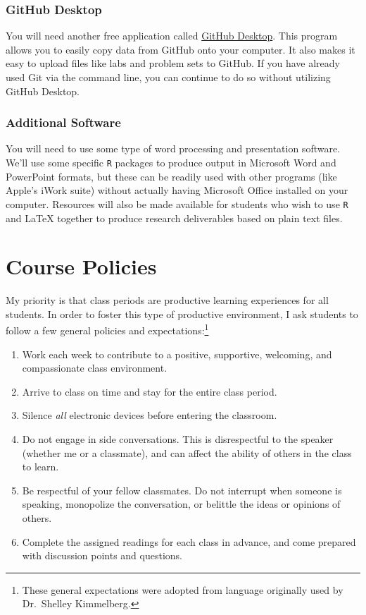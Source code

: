 \documentclass[]{book}
\providecommand{\tightlist}{%
  \setlength{\itemsep}{0pt}\setlength{\parskip}{0pt}}
\let\rmarkdownfootnote\footnote%
\def\footnote{\protect\rmarkdownfootnote}
\theoremstyle{definition}
\theoremstyle{definition}
\theoremstyle{definition}
\theoremstyle{remark}
\begin{document}
\hypertarget{github-desktop}{%
\subsection{GitHub Desktop}\label{github-desktop}}

You will need another free application called
\href{https://desktop.github.com}{GitHub Desktop}. This program allows
you to easily copy data from GitHub onto your computer. It also makes it
easy to upload files like labs and problem sets to GitHub. If you have
already used Git via the command line, you can continue to do so without
utilizing GitHub Desktop.

\hypertarget{additional-software}{%
\subsection{Additional Software}\label{additional-software}}

You will need to use some type of word processing and presentation
software. We'll use some specific \texttt{R} packages to produce output
in Microsoft Word and PowerPoint formats, but these can be readily used
with other programs (like Apple's iWork suite) without actually having
Microsoft Office installed on your computer. Resources will also be made
available for students who wish to use \texttt{R} and LaTeX together to
produce research deliverables based on plain text files.

\hypertarget{course-policies}{%
\chapter{Course Policies}\label{course-policies}}

My priority is that class periods are productive learning experiences
for all students. In order to foster this type of productive
environment, I ask students to follow a few general policies and
expectations:\footnote{These general expectations were adopted from
  language originally used by Dr.~Shelley Kimmelberg.}

\begin{enumerate}
\def\labelenumi{\arabic{enumi}.}
\tightlist
\item
  Work each week to contribute to a positive, supportive, welcoming, and
  compassionate class environment.
\item
  Arrive to class on time and stay for the entire class period.
\item
  Silence \emph{all} electronic devices before entering the classroom.
\item
  Do not engage in side conversations. This is disrespectful to the
  speaker (whether me or a classmate), and can affect the ability of
  others in the class to learn.
\item
  Be respectful of your fellow classmates. Do not interrupt when someone
  is speaking, monopolize the conversation, or belittle the ideas or
  opinions of others.
\item
  Complete the assigned readings for each class in advance, and come
  prepared with discussion points and questions.
\end{enumerate}
\end{document}

